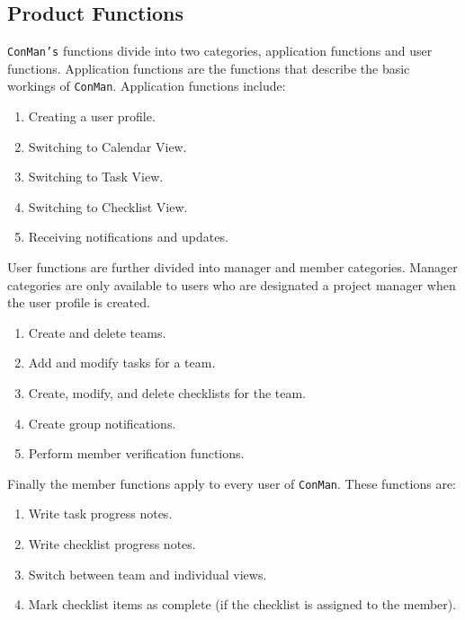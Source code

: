 \documentclass{article}
\begin{document}
\subsection{Product Functions}
\texttt{ConMan's} functions divide into two categories, application functions and user functions.  Application functions are the functions that describe the basic workings of \texttt{ConMan}.  Application functions include:
\begin{enumerate}
    \item Creating a user profile.
    \item Switching to Calendar View.
    \item Switching to Task View.
    \item Switching to Checklist View.
    \item Receiving notifications and updates.
\end{enumerate}

User functions are further divided into manager and member categories.
Manager categories are only available to users who are designated a project manager when the user profile is created.
\begin{enumerate}
    \item Create and delete teams.
    \item Add and modify tasks for a team.
    \item Create, modify, and delete checklists for the team.
    \item Create group notifications.
    \item Perform member verification functions.
\end{enumerate}
Finally the member functions apply to every user of \texttt{ConMan}.  These functions are:
\begin{enumerate}
    \item Write task progress notes.
    \item Write checklist progress notes.
    \item Switch between team and individual views.
    \item Mark checklist items as complete (if the checklist is assigned to the member).
\end{enumerate}
\end{document}
